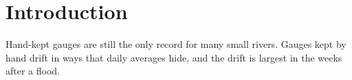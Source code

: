 \begin{abstract}
River gauges kept by hand drift in ways that daily averages hide, and the drift is largest in the weeks after a flood.
\end{abstract}
\section{Introduction}
Hand-kept gauges are still the only record for many small rivers. Gauges kept by hand drift in ways that daily averages hide, and the drift is largest in the weeks after a flood.
